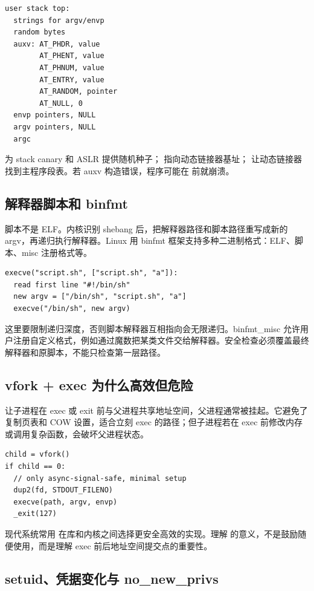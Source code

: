 \begin{lstlisting}
user stack top:
  strings for argv/envp
  random bytes
  auxv: AT_PHDR, value
        AT_PHENT, value
        AT_PHNUM, value
        AT_ENTRY, value
        AT_RANDOM, pointer
        AT_NULL, 0
  envp pointers, NULL
  argv pointers, NULL
  argc
\end{lstlisting}

 为 stack canary 和 ASLR 提供随机种子； 指向动态链接器基址； 让动态链接器找到主程序段表。若 auxv 构造错误，程序可能在  前就崩溃。

\subsection{解释器脚本和 binfmt}

 脚本不是 ELF。内核识别 shebang 后，把解释器路径和脚本路径重写成新的 argv，再递归执行解释器。Linux 用 binfmt 框架支持多种二进制格式：ELF、脚本、misc 注册格式等。

\begin{lstlisting}
execve("script.sh", ["script.sh", "a"]):
  read first line "#!/bin/sh"
  new argv = ["/bin/sh", "script.sh", "a"]
  execve("/bin/sh", new argv)
\end{lstlisting}

这里要限制递归深度，否则脚本解释器互相指向会无限递归。binfmt\_misc 允许用户注册自定义格式，例如通过魔数把某类文件交给解释器。安全检查必须覆盖最终解释器和原脚本，不能只检查第一层路径。

\subsection{vfork + exec 为什么高效但危险}

 让子进程在 exec 或 exit 前与父进程共享地址空间，父进程通常被挂起。它避免了复制页表和 COW 设置，适合立刻 exec 的路径；但子进程若在 exec 前修改内存或调用复杂函数，会破坏父进程状态。

\begin{lstlisting}
child = vfork()
if child == 0:
  // only async-signal-safe, minimal setup
  dup2(fd, STDOUT_FILENO)
  execve(path, argv, envp)
  _exit(127)
\end{lstlisting}

现代系统常用  在库和内核之间选择更安全高效的实现。理解  的意义，不是鼓励随便使用，而是理解 exec 前后地址空间提交点的重要性。

\subsection{setuid、凭据变化与 no\_new\_privs}

